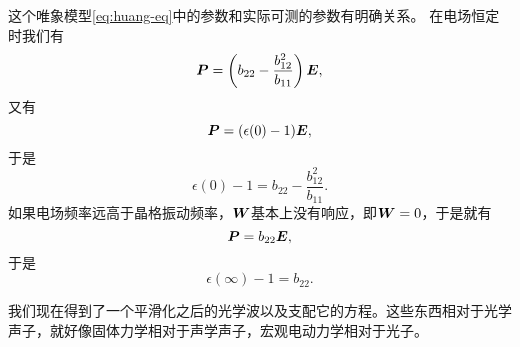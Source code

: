 \documentclass[hyperref, UTF8, a4paper]{ctexart}
\begin{document}
这个唯象模型\eqref{eq:huang-eq}中的参数和实际可测的参数有明确关系。
在电场恒定时我们有
\[
    \vb*{P} = \left( b_{22} - \frac{b_{12}^2}{b_{11}} \right) \vb*{E},
\]
又有
\[
    \vb*{P} = (\epsilon(0) - 1) \vb*{E},
\]
于是
\begin{equation}
    \epsilon(0) - 1 = b_{22} - \frac{b_{12}^2}{b_{11}}.
\end{equation}
如果电场频率远高于晶格振动频率，$\vb*{W}$基本上没有响应，即$\vb*{W}=0$，于是就有
\[
    \vb*{P} = b_{22} \vb*{E},
\]
于是
\begin{equation}
    \epsilon(\infty) - 1 = b_{22}.
\end{equation}

我们现在得到了一个平滑化之后的光学波以及支配它的方程。这些东西相对于光学声子，就好像固体力学相对于声学声子，宏观电动力学相对于光子。
\end{document}
